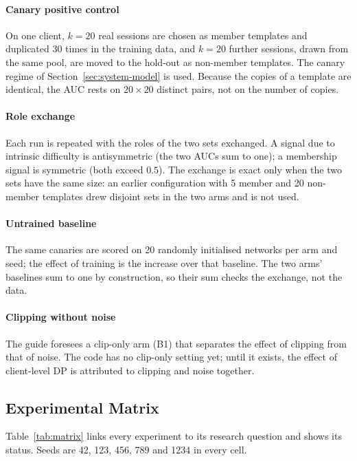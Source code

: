 \paragraph{Canary positive control} On one client, $k = 20$ real sessions are
chosen as member templates and duplicated 30 times in the training data, and
$k = 20$ further sessions, drawn from the same pool, are moved to the
hold-out as non-member templates. The canary regime of
Section~\ref{sec:system-model} is used. Because the copies of a template are
identical, the AUC rests on $20 \times 20$ distinct pairs, not on the number
of copies.

\paragraph{Role exchange} Each run is repeated with the roles of the two sets
exchanged. A signal due to intrinsic difficulty is antisymmetric (the two AUCs
sum to one); a membership signal is symmetric (both exceed $0.5$). The exchange
is exact only when the two sets have the same size: an earlier configuration
with 5 member and 20 non-member templates drew disjoint sets in the two arms
and is not used.

\paragraph{Untrained baseline} The same canaries are scored on 20 randomly
initialised networks per arm and seed; the effect of training is the increase
over that baseline. The two arms' baselines sum to one by construction, so
their sum checks the exchange, not the data.

\paragraph{Clipping without noise} The guide foresees a clip-only arm (B1)
that separates the effect of clipping from that of noise. The code has no
clip-only setting yet; until it exists, the effect of client-level DP is
attributed to clipping and noise together. 

\subsection{Experimental Matrix}
\label{sec:method-matrix}

Table~\ref{tab:matrix} links every experiment to its research question and
shows its status. Seeds are 42, 123, 456, 789 and 1234 in every cell.

